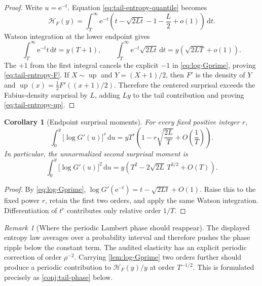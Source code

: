 \documentclass[11pt,oneside]{article}
\newtheorem{corollary}[theorem]{Corollary}
\theoremstyle{definition}
\theoremstyle{remark}
\newtheorem{remark}[theorem]{Remark}
\newcommand{\Up}{\operatorname{up}}
\newcommand{\dd}{\,\mathrm d}
\newcommand{\e}{\mathrm e}
\begin{document}
\begin{proof}
Write $u=\e^{-t}$.  Equation \eqref{eq:tail-entropy-quantile} becomes
\[
 \mathscr H_F(y)=\int_T^\infty \e^{-t}
 \left(t-\sqrt{2Lt}-1-\frac L2+o(1)\right)\dd t.
\]
Watson integration at the lower endpoint gives
\[
 \int_T^\infty\e^{-t}t\dd t=y(T+1),
 \qquad
 \int_T^\infty\e^{-t}\sqrt{2Lt}\dd t
 =y\left(\sqrt{2LT}+o(1)\right).
\]
The $+1$ from the first integral cancels the explicit $-1$ in
\eqref{eq:log-Gprime}, proving \eqref{eq:tail-entropy-F}.  If
$X\sim\Up$ and $Y=(X+1)/2$, then $F'$ is the density of $Y$ and
$\Up(x)=\tfrac12F'((x+1)/2)$.  Therefore the centered surprisal exceeds the
Fabius-density surprisal by $L$, adding $Ly$ to the tail contribution and proving
\eqref{eq:tail-entropy-up}.
\end{proof}

\begin{corollary}[Endpoint surprisal moments]
\label{cor:tail-moments}
For every fixed positive integer $r$,
\begin{equation}
 \int_0^y\bigl[\log G'(u)\bigr]^r\dd u
 =yT^r\left(1-r\sqrt{\frac{2L}{T}}+O\!\left(\frac1T\right)\right).
 \label{eq:tail-surprisal-moments}
\end{equation}
In particular, the unnormalized second surprisal moment is
\begin{equation}
 \int_0^y\bigl[\log G'(u)\bigr]^2\dd u
 =y\left(T^2-2\sqrt{2L}\,T^{3/2}+O(T)\right).
 \label{eq:tail-second-moment}
\end{equation}
\end{corollary}

\begin{proof}
By \eqref{eq:log-Gprime},
$\log G'(\e^{-t})=t-\sqrt{2Lt}+O(1)$.  Raise this to the fixed power $r$, retain
the first two orders, and apply the same Watson integration.  Differentiation of
$t^r$ contributes only relative order $1/T$.
\end{proof}

\begin{remark}[Where the periodic Lambert phase should reappear]
The displayed entropy law averages over a probability interval and therefore
pushes the phase ripple below the constant term.  The audited elasticity has an
explicit periodic correction of order $\rho^{-2}$.  Carrying
\cref{lem:log-Gprime} two orders further should produce a periodic contribution
to $\mathscr H_F(y)/y$ at order $T^{-1/2}$.  This is formulated precisely as
\cref{conj:tail-phase} below.
\end{remark}
\end{document}
